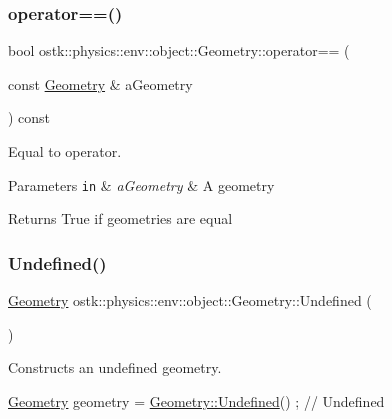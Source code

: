 \subsubsection{\texorpdfstring{operator==()}{operator==()}}
{\footnotesize\ttfamily bool ostk\+::physics\+::env\+::object\+::\+Geometry\+::operator== (\begin{DoxyParamCaption}\item[{const \hyperlink{classostk_1_1physics_1_1env_1_1object_1_1_geometry}{Geometry} \&}]{a\+Geometry }\end{DoxyParamCaption}) const}



Equal to operator. 


\begin{DoxyParams}[1]{Parameters}
\mbox{\tt in}  & {\em a\+Geometry} & A geometry \\
\hline
\end{DoxyParams}
\begin{DoxyReturn}{Returns}
True if geometries are equal 
\end{DoxyReturn}
\mbox{\label{classostk_1_1physics_1_1env_1_1object_1_1_geometry_a5954c3485fd2a21b1d1419e08a6dcc4e}} 
\subsubsection{\texorpdfstring{Undefined()}{Undefined()}}
{\footnotesize\ttfamily \hyperlink{classostk_1_1physics_1_1env_1_1object_1_1_geometry}{Geometry} ostk\+::physics\+::env\+::object\+::\+Geometry\+::\+Undefined (\begin{DoxyParamCaption}{ }\end{DoxyParamCaption})\hspace{0.3cm}{\ttfamily [static]}}



Constructs an undefined geometry. 


\begin{DoxyCode}
\hyperlink{classostk_1_1physics_1_1env_1_1object_1_1_geometry_a99cd68601f35dd7c24bb7e441728b65a}{Geometry} geometry = \hyperlink{classostk_1_1physics_1_1env_1_1object_1_1_geometry_a5954c3485fd2a21b1d1419e08a6dcc4e}{Geometry::Undefined}() ; \textcolor{comment}{// Undefined}
\end{DoxyCode}


